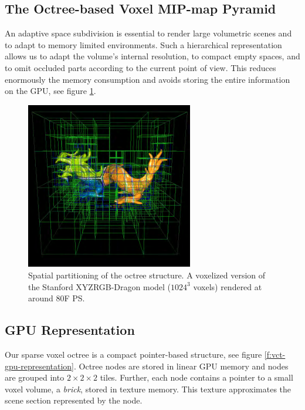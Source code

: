 \subsection{The Octree-based Voxel MIP-map Pyramid}
An adaptive space subdivision is essential to render large volumetric scenes and to adapt to memory limited environments. Such a hierarchical representation allows us to adapt the volume's internal resolution, to compact empty spaces, and to omit occluded parts according to the current point of view. This reduces enormously the memory consumption and avoids storing the entire information on the GPU, see figure \ref{f:vct-voxel-representation}.

\begin{figure}
\sidecaption
	\includegraphics[width=0.65\textwidth]{graphics/vct/vct-13-1}
	\caption{Spatial partitioning of the octree structure. A voxelized version of the Stanford XYZRGB-Dragon model ($1024^{3}$ voxels) rendered at around 80F PS.}
	\label{f:vct-voxel-representation}
\end{figure}



\subsection{GPU Representation}\label{sec:vct-gpu}
Our sparse voxel octree is a compact pointer-based structure, see figure \ref{f:vct-gpu-representation}. Octree nodes are stored in linear GPU memory and nodes are grouped into $2\times 2\times 2$ tiles. Further, each node contains a pointer to a small voxel volume, a \textit{brick}, stored in texture memory. This texture approximates the scene section represented by the node. 

